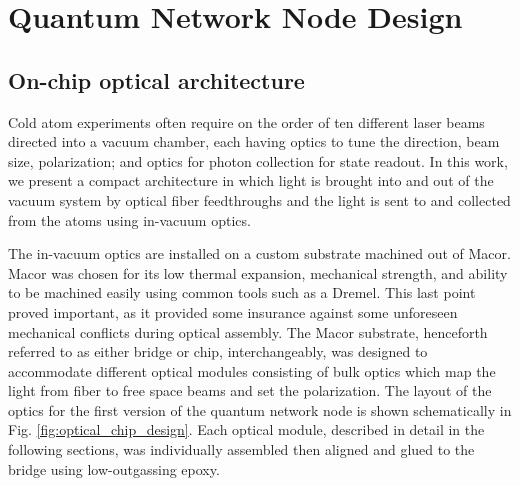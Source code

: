 \section{Quantum Network Node Design}
\subsection{On-chip optical architecture}

Cold atom experiments often require on the order of ten different laser beams directed into a vacuum chamber, each having optics to tune the direction, beam size, polarization; and optics for photon collection for state readout. In this work, we present a compact architecture in which light is brought into and out of the vacuum system by optical fiber feedthroughs and the light is sent to and collected from the atoms using in-vacuum optics. 


The in-vacuum optics are installed on a custom substrate  machined out of Macor. Macor was chosen for its low thermal expansion, mechanical strength, and ability to be machined easily using common tools such as a Dremel. This last point proved important, as it provided some insurance against some unforeseen mechanical conflicts during optical assembly. The Macor substrate, henceforth referred to as either bridge or chip, interchangeably, was designed to accommodate different optical modules consisting of bulk optics which map the light from fiber to free space beams and set the polarization. The layout of the optics for the first version of the quantum network node is shown schematically in Fig. \ref{fig:optical_chip_design}. Each optical module, described in detail in the following sections, was individually assembled then aligned and glued to the bridge using low-outgassing epoxy. 

